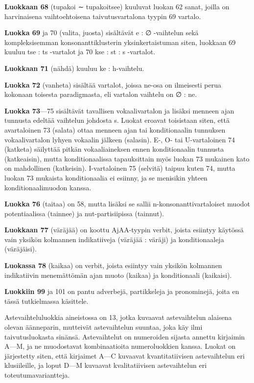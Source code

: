 \documentclass[free]{flammie}
\begin{document}
\textbf{Luokkaan 68} (tupakoi ∼ tupakoitsee) kuuluvat luokan 62 sanat, joilla on harvinaisena vaihtoehtoisena taivutusvartalona tyypin 69 vartalo.

\textbf{Luokka 69} ja 70 (valita, juosta) sisältävät e : ∅ -vaihtelun sekä kompleksisemman
konsonanttiklusterin yksinkertaistuman siten, luokkaan 69 kuuluu tse : ts -vartalot ja 70 kse : st : s -vartalot.

\textbf{Luokkaan 71} (nähdä) kuuluu ke : h-vaihtelu.

\textbf{Luokka 72} (vanheta) sisältää vartalot, joissa ne-osa on ilmeisesti perua kokonaan
toisesta paradigmasta, eli vartalon vaihtelu on ∅ : ne.

\textbf{Luokka 73}—75 sisältävät tavallisen vokaalivartalon ja lisäksi menneen ajan
tunnusta edeltää vaihtelun johdosta s. Luokat eroavat toisistaan siten, että avartaloinen 73 (salata) ottaa menneen ajan tai konditionaalin tunnuksen vokaalivartalon lyhyen vokaalin jälkeen (salasin). E-, O- tai U-vartaloinen 74 (katketa)
säilyttää pitkän vokaaliaineksen ennen konditionaalin tunnusta (katkeaisin), mutta konditionaalissa tapauksittain myös luokan 73 mukainen kato on mahdollinen
(katkeisin). I-vartaloinen 75 (selvitä) taipuu kuten 74, mutta luokan 73 mukaista
konditionaalia ei esiinny, ja se menisikin yhteen konditionaalimuodon kanssa.

\textbf{Luokka 76} (taitaa) on 58, mutta lisäksi se sallii n-konsonanttivartaloiset muodot
potentiaalissa (tainnee) ja nut-partisiipissa (tainnut).

\textbf{Luokkaan 77} (väräjää) on koottu AjAA-tyypin verbit, joista esiintyy käytössä
vain yksikön kolmannen indikatiiveja (väräjää : väräji) ja konditionaaleja (väräjäisi).

\textbf{Luokassa 78} (kaikaa) on verbit, joista esiintyy vain yksikön kolmannen indikatiivin menemättömän ajan muoto (kaikaa) ja konditionaali (kaikaisi).

\textbf{Luokkiin 99} ja 101 on pantu adverbejä, partikkeleja ja pronominejä, joita en tässä
tutkielmassa käsittele.

Astevaihteluluokkia aineistossa on 13, jotka kuvaavat astevaihtelun alaisena olevan äänneparin, mutteivät astevaihtelun suuntaa, joka käy ilmi taivutusluokasta
sinänsä. Astevaihtelut on numeroiden sijasta annettu kirjaimin A—M, ja ne muodostavat kombinaatioita numeroluokkien kanssa. Luokat on järjestetty siten, että kirjaimet A—C kuvaavat kvantitatiivisen astevaihtelun eri klusiileille, ja loput
D—M kuvaavat kvalitatiivisen astevaihtelun eri toteutumavariantteja.
\end{document}
